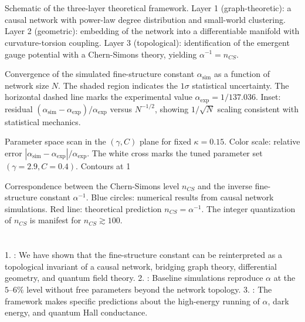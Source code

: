 \documentclass[11pt,a4paper]{article}
\theoremstyle{plain}
\theoremstyle{definition}
\begin{document}
\textemdash{}

\section{\1}

\textbf{\1} Schematic of the three-layer theoretical framework. Layer 1 (graph-theoretic): a causal network with power-law degree distribution and small-world clustering. Layer 2 (geometric): embedding of the network into a differentiable manifold with curvature-torsion coupling. Layer 3 (topological): identification of the emergent gauge potential with a Chern-Simons theory, yielding $\alpha^{-1} = n_{CS}$.

\textbf{\1} Convergence of the simulated fine-structure constant $\alpha_{\text{sim}}$ as a function of network size $N$. The shaded region indicates the $1\sigma$ statistical uncertainty. The horizontal dashed line marks the experimental value $\alpha_{\text{exp}} = 1/137.036$. Inset: residual $(\alpha_{\text{sim}} - \alpha_{\text{exp}}) / \alpha_{\text{exp}}$ versus $N^{-1/2}$, showing $1/\sqrt{N}$ scaling consistent with statistical mechanics.

\textbf{\1} Parameter space scan in the $(\gamma, C)$ plane for fixed $\kappa = 0.15$. Color scale: relative error $|\alpha_{\text{sim}} - \alpha_{\text{exp}}| / \alpha_{\text{exp}}$. The white cross marks the tuned parameter set $(\gamma = 2.9, C = 0.4)$. Contours at 1%

\textbf{\1} Correspondence between the Chern-Simons level $n_{CS}$ and the inverse fine-structure constant $\alpha^{-1}$. Blue circles: numerical results from causal network simulations. Red line: theoretical prediction $n_{CS} = \alpha^{-1}$. The integer quantization of $n_{CS}$ is manifest for $n_{CS} \gtrsim 100$.

\textemdash{}

\section{\1}

\subsection{\1}

1. \textbf{\1}: We have shown that the fine-structure constant can be reinterpreted as a topological invariant of a causal network, bridging graph theory, differential geometry, and quantum field theory.
2. \textbf{\1}: Baseline simulations reproduce $\alpha$ at the $5\text{--}6\%$ level without free parameters beyond the network topology.
3. \textbf{\1}: The framework makes specific predictions about the high-energy running of $\alpha$, dark energy, and quantum Hall conductance.
\end{document}
